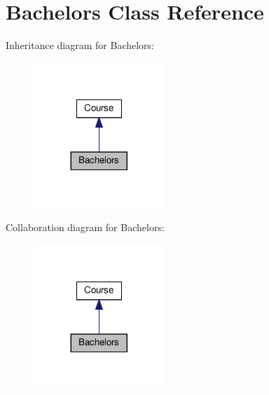 \hypertarget{classBachelors}{}\section{Bachelors Class Reference}
\label{classBachelors}


Inheritance diagram for Bachelors\+:\nopagebreak
\begin{figure}[H]
\begin{center}
\leavevmode
\includegraphics[width=140pt]{classBachelors__inherit__graph}
\end{center}
\end{figure}


Collaboration diagram for Bachelors\+:\nopagebreak
\begin{figure}[H]
\begin{center}
\leavevmode
\includegraphics[width=140pt]{classBachelors__coll__graph}
\end{center}
\end{figure}
